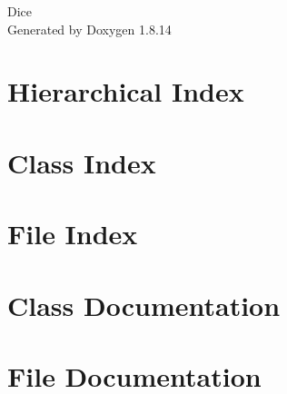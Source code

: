 \documentclass[twoside]{book}
\newcommand{\+}{\discretionary{\mbox{\scriptsize$\hookleftarrow$}}{}{}}
\newcommand{\clearemptydoublepage}{%
  \newpage{\pagestyle{empty}\cleardoublepage}%
}
\begin{document}
\hypersetup{pageanchor=false,
             bookmarksnumbered=true,
             pdfencoding=unicode
            }
\begin{titlepage}
\vspace*{7cm}
\begin{center}%
{\Large Dice }\\
\vspace*{1cm}
{\large Generated by Doxygen 1.8.14}\\
\end{center}
\end{titlepage}
\clearemptydoublepage
{}
\tableofcontents
\clearemptydoublepage
{}
\hypersetup{pageanchor=true}

\chapter{Hierarchical Index}

\chapter{Class Index}

\chapter{File Index}

\chapter{Class Documentation}



































\chapter{File Documentation}





\backmatter
\newpage
{}
\clearemptydoublepage
{}
\printindex
\end{document}
